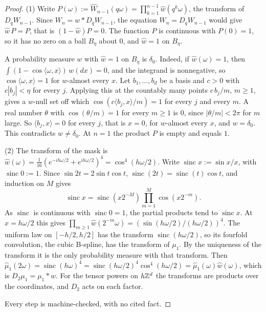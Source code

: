 \begin{proof}
\leanok
(1) Write $P(\omega) := \widehat W_{n-1}(q\omega) = \prod_{k=1}^{n-1}\widehat w(q^k\omega)$, the
transform of $D_qW_{n-1}$. Since $W_n = w * D_qW_{n-1}$, the equation $W_n = D_qW_{n-1}$ would give
$\widehat w\,P = P$, that is $(1 - \widehat w)P = 0$. The function $P$ is continuous with
$P(0) = 1$, so it has no zero on a ball $B_\eta$ about $0$, and $\widehat w = 1$ on $B_\eta$.

A probability measure $w$ with $\widehat w = 1$ on $B_\eta$ is $\delta_0$. Indeed, if
$\widehat w(\omega) = 1$, then $\int(1 - \cos\langle\omega, x\rangle)\,w(dx) = 0$, and the integrand
is nonnegative, so $\cos\langle\omega, x\rangle = 1$ for $w$-almost every $x$. Let $b_1, \dots, b_d$
be a basis and $c > 0$ with $c|b_j| < \eta$ for every $j$. Applying this at the countably many points
$c\,b_j/m$, $m \ge 1$, gives a $w$-null set off which $\cos(c\langle b_j, x\rangle/m) = 1$ for every
$j$ and every $m$. A real number $\theta$ with $\cos(\theta/m) = 1$ for every $m \ge 1$ is $0$,
since $|\theta/m| < 2\pi$ for $m$ large. So $\langle b_j, x\rangle = 0$ for every $j$, that is $x = 0$,
for $w$-almost every $x$, and $w = \delta_0$. This contradicts $w \ne \delta_0$. At $n = 1$ the
product $P$ is empty and equals $1$.

(2) The transform of the mask is
$\widehat w(\omega) = \tfrac1{16}(e^{-ih\omega/2} + e^{ih\omega/2})^4 = \cos^4(h\omega/2)$. Write
$\operatorname{sinc} x := \sin x/x$, with $\operatorname{sinc} 0 := 1$. Since
$\sin 2t = 2\sin t\cos t$, $\operatorname{sinc}(2t) = \operatorname{sinc}(t)\cos t$, and induction
on $M$ gives
\[
  \operatorname{sinc} x = \operatorname{sinc}(x2^{-M})\prod_{m=1}^{M}\cos(x2^{-m}) .
\]
As $\operatorname{sinc}$ is continuous with $\operatorname{sinc} 0 = 1$, the partial products tend
to $\operatorname{sinc} x$. At $x = h\omega/2$ this gives
$\prod_{m \ge 1}\widehat w(2^{-m}\omega) = (\sin(h\omega/2)/(h\omega/2))^4$. The uniform law on
$[-h/2, h/2]$ has the transform $\operatorname{sinc}(h\omega/2)$, so its fourfold convolution, the
cubic B-spline, has the transform of $\mu_1$. By the uniqueness of the transform it is the only
probability measure with that transform. Then
$\widehat\mu_1(2\omega) = \operatorname{sinc}(h\omega)^4
= \operatorname{sinc}(h\omega/2)^4\cos^4(h\omega/2) = \widehat\mu_1(\omega)\widehat w(\omega)$,
which is $D_2\mu_1 = \mu_1 * w$. For the tensor powers on $h\mathbb{Z}^d$ the transforms are products over
the coordinates, and $D_2$ acts on each factor.

Every step is machine-checked, with no cited fact.
\end{proof}

